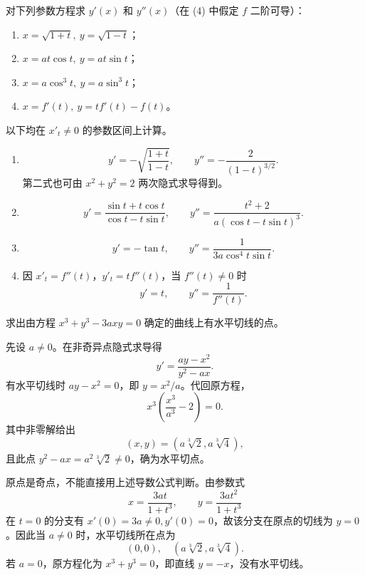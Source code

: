 \begin{xexercise}[10]
对下列参数方程求 $y'(x)$ 和 $y''(x)$（在 (4) 中假定 $f$ 二阶可导）：
  \begin{enumerate}[label=(\arabic*)]
    \item $x=\sqrt{1+t},\ y=\sqrt{1-t}$；
    \item $x=at\cos t,\ y=at\sin t$；
    \item $x=a\cos^3t,\ y=a\sin^3t$；
    \item $x=f'(t),\ y=tf'(t)-f(t)$。
  \end{enumerate}
\end{xexercise}
\begin{xsolution}
以下均在 $x'_t\ne0$ 的参数区间上计算。
\begin{enumerate}[label=(\arabic*)]
  \item
  \[
    \boxed{y'=-\sqrt{\frac{1+t}{1-t}}},
    \qquad
    \boxed{y''=-\frac2{(1-t)^{3/2}}}.
  \]
  第二式也可由 $x^2+y^2=2$ 两次隐式求导得到。
  \item
  \[
    \boxed{y'=\frac{\sin t+t\cos t}{\cos t-t\sin t}},
    \qquad
    \boxed{y''=\frac{t^2+2}{a(\cos t-t\sin t)^3}}.
  \]
  \item
  \[
    \boxed{y'=-\tan t},
    \qquad
    \boxed{y''=\frac1{3a\cos^4t\sin t}}.
  \]
  \item 因 $x'_t=f''(t)$，$y'_t=tf''(t)$，当 $f''(t)\ne0$ 时
  \[
    \boxed{y'=t},\qquad \boxed{y''=\frac1{f''(t)}}.
  \]
\end{enumerate}
\end{xsolution}


\begin{xexercise}[11]
求出由方程 $x^3+y^3-3axy=0$ 确定的曲线上有水平切线的点。
\end{xexercise}
\begin{xsolution}
先设 $a\ne0$。在非奇异点隐式求导得
\[
  y'=\frac{ay-x^2}{y^2-ax}.
\]
有水平切线时 $ay-x^2=0$，即 $y=x^2/a$。代回原方程，
\[
  x^3\left(\frac{x^3}{a^3}-2\right)=0.
\]
其中非零解给出
\[
  (x,y)=(a\sqrt[3]{2},a\sqrt[3]{4}),
\]
且此点 $y^2-ax=a^2\sqrt[3]{2}\ne0$，确为水平切点。

原点是奇点，不能直接用上述导数公式判断。由参数式
\[
  x=\frac{3at}{1+t^3},\qquad y=\frac{3at^2}{1+t^3}
\]
在 $t=0$ 的分支有 $x'(0)=3a\ne0,y'(0)=0$，故该分支在原点的切线为 $y=0$。因此当 $a\ne0$ 时，水平切线所在点为
\[
  \boxed{(0,0),\quad(a\sqrt[3]{2},a\sqrt[3]{4})}.
\]
若 $a=0$，原方程化为 $x^3+y^3=0$，即直线 $y=-x$，没有水平切线。
\end{xsolution}



